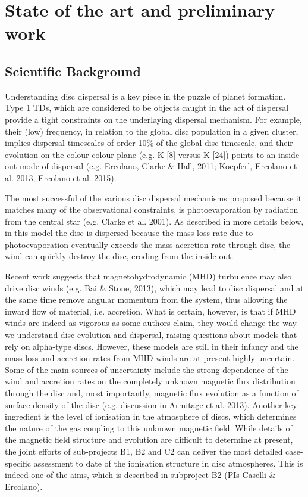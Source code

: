 \documentclass[10pt,fleqn,twoside]{article}
\newcommand{\Tcol}{\color{blue}}
\begin{document}
\section{\Tcol State of the art and preliminary work}
\renewcommand{\leftmark}{\sc State of the Art and preliminary work}

\subsection{Scientific Background}

Understanding disc dispersal is a key piece in the puzzle of planet
formation. Type 1 TDs, which are considered to be objects caught in
the act of dispersal provide a tight constraints on the underlaying
dispersal mechanism. For example, their (low) frequency, in relation
to the global disc population in a given cluster, implies dispersal
timescales of order 10\% of the global disc timescale, and their
evolution on the colour-colour plane (e.g. K-[8] versus K-[24]) points
to an inside-out mode of 
dispersal (e.g. Ercolano, Clarke \& Hall, 2011; Koepferl, Ercolano et
al. 2013; Ercolano et al. 2015). 

The most successful of the various disc dispersal mechanisms proposed
because it
matches many of the observational constraints, 
is photoevaporation by radiation from the central star
(e.g. Clarke et al. 2001). As described in more details below, in this
model the disc is dispersed because
the mass loss rate due to photoevaporation eventually exceeds the mass accretion
rate through disc, the wind can quickly destroy the disc, eroding from the inside-out.

Recent work suggests that magnetohydrodynamic (MHD) turbulence may also
drive disc winds (e.g. Bai \& Stone, 2013), which may lead to disc
dispersal and at the same time remove angular momentum from the
system, thus allowing the inward flow of material, i.e. accretion. What is certain, however, is that if MHD winds are indeed
as vigorous as some authors claim, they would change the
way we understand disc evolution and dispersal, raising questions
about models that  rely on alpha-type discs. However, these models are still in their infancy and the
mass loss and accretion rates from MHD winds are at present highly
uncertain. Some of the main
sources of uncertainty include the strong dependence of the wind and
accretion rates on the completely unknown magnetic flux distribution
through the disc and, most importantly, magnetic flux evolution as a
function of surface density of the disc (e.g. discussion in Armitage
et al. 2013). Another key ingredient is the level of ionisation in the
atmosphere of discs, which determines the nature of the gas coupling to
this unknown magnetic field. While details of the magnetic field
structure and evolution are difficult to determine at present, the
joint efforts of sub-projects B1, B2 and C2 can deliver the most
detailed case-specific assessment to date of the ionisation structure in disc
atmospheres. This is indeed one of the aims, which is described in
subproject B2 (PIs Caselli \& Ercolano).  
\end{document}
